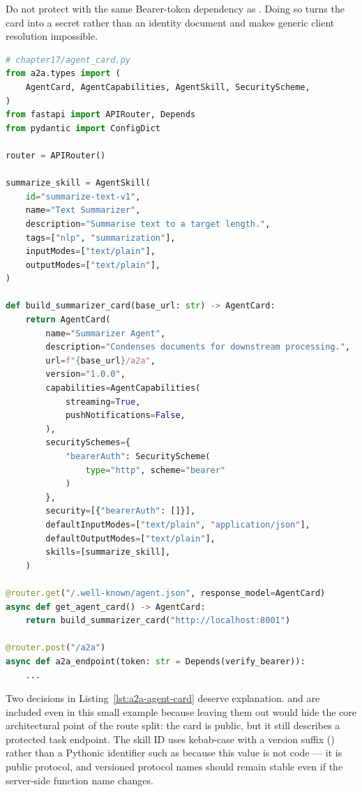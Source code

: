 \begin{warningbox}
Do not protect  with the same Bearer-token
dependency as . Doing so turns the card into a secret rather
than an identity document and makes generic client resolution impossible.
\end{warningbox}

\begin{lstlisting}[language=Python,
  caption={Spec-compliant \texttt{AgentCard} factory and route split},
  label={lst:a2a-agent-card}]
# chapter17/agent_card.py
from a2a.types import (
    AgentCard, AgentCapabilities, AgentSkill, SecurityScheme,
)
from fastapi import APIRouter, Depends
from pydantic import ConfigDict

router = APIRouter()

summarize_skill = AgentSkill(
    id="summarize-text-v1",
    name="Text Summarizer",
    description="Summarise text to a target length.",
    tags=["nlp", "summarization"],
    inputModes=["text/plain"],
    outputModes=["text/plain"],
)

def build_summarizer_card(base_url: str) -> AgentCard:
    return AgentCard(
        name="Summarizer Agent",
        description="Condenses documents for downstream processing.",
        url=f"{base_url}/a2a",
        version="1.0.0",
        capabilities=AgentCapabilities(
            streaming=True,
            pushNotifications=False,
        ),
        securitySchemes={
            "bearerAuth": SecurityScheme(
                type="http", scheme="bearer"
            )
        },
        security=[{"bearerAuth": []}],
        defaultInputModes=["text/plain", "application/json"],
        defaultOutputModes=["text/plain"],
        skills=[summarize_skill],
    )

@router.get("/.well-known/agent.json", response_model=AgentCard)
async def get_agent_card() -> AgentCard:
    return build_summarizer_card("http://localhost:8001")

@router.post("/a2a")
async def a2a_endpoint(token: str = Depends(verify_bearer)):
    ...
\end{lstlisting}

Two decisions in Listing~\ref{lst:a2a-agent-card} deserve explanation.
 and  are included even in this small
example because leaving them out would hide the core architectural point of
the route split: the card is public, but it still describes a protected
task endpoint. The skill ID uses kebab-case with a version suffix
() rather than a Pythonic identifier such as
 because this value is not code --- it is public
protocol, and versioned protocol names should remain stable even if the
server-side function name changes.

